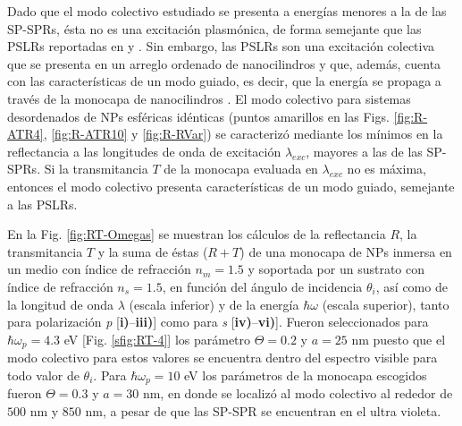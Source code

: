  Dado que el modo colectivo estudiado se presenta a energías menores a la de las SP-SPRs, ésta no es una excitación plasmónica, de forma semejante que las PSLRs reportadas en  \cite{kabashin2009plasmonic} y \cite{danilov2018ultra}. Sin embargo, las PSLRs son una excitación colectiva que se presenta en un arreglo ordenado de nanocilindros \cite{kabashin2009plasmonic} y \cite{danilov2018ultra} que, además, cuenta con las características de un modo guiado, es decir, que la energía se propaga a través de la monocapa de nanocilindros \cite{kabashin2009plasmonic}. El modo colectivo  para sistemas desordenados de NPs esféricas idénticas (puntos amarillos en las Figs. \ref{fig:R-ATR4}, \ref{fig:R-ATR10} y \ref{fig:R-RVar}) se caracterizó mediante los mínimos en la reflectancia a las  longitudes de onda de excitación $\lambda_{exc}$, mayores a las de las SP-SPRs. Si la transmitancia $T$ de la monocapa evaluada en $\lambda_{exc}$ no es máxima, entonces el modo colectivo presenta características de un modo guiado, semejante a las PSLRs.

 En la Fig. \ref{fig:RT-Omegas} se muestran los cálculos de la reflectancia $R$, la transmitancia $T$ y la suma de éstas ($R+T$) de una monocapa de NPs inmersa en un medio con índice de refracción $n_m=1.5$ y soportada por un sustrato con índice de refracción $n_s=1.5$, en función del ángulo de incidencia $\theta_i$, así como de la longitud de onda $\lambda$ (escala inferior) y de la energía  $\hbar\omega$ (escala superior), tanto para polarización \emph{p}  [\textbf{i)}--\textbf{iii)}] como para \emph{s} [\textbf{iv)}--\textbf{vi)}]. Fueron seleccionados para $\hbar\omega_p=4.3$ eV [Fig. \ref{sfig:RT-4}] los parámetro $\Theta=0.2$ y $a=25$ nm puesto que el modo colectivo para estos valores se encuentra dentro del espectro visible para todo valor de $\theta_i$. Para $\hbar\omega_p=10$ eV los parámetros de la monocapa escogidos fueron $\Theta=0.3$ y $a=30$ nm, en donde se localizó al modo colectivo al rededor de $500$ nm y $850$ nm, a pesar de que las SP-SPR se encuentran en el ultra violeta.
 
